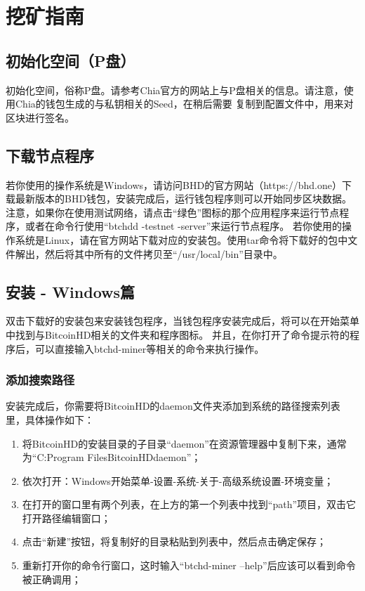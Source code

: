 \chapter{挖矿指南}
\section{初始化空间（P盘）}
\begin{flushleft}
    初始化空间，俗称P盘。请参考Chia官方的网站上与P盘相关的信息。请注意，使用Chia的钱包生成的与私钥相关的Seed，在稍后需要
    复制到配置文件中，用来对区块进行签名。
\end{flushleft}
\section{下载节点程序}
\begin{flushleft}
    若你使用的操作系统是Windows，请访问BHD的官方网站（https://bhd.one）下载最新版本的BHD钱包，安装完成后，运行钱包程序则可以开始同步区块数据。
    注意，如果你在使用测试网络，请点击``绿色''图标的那个应用程序来运行节点程序，或者在命令行使用``btchdd -testnet -server''来运行节点程序。
    若你使用的操作系统是Linux，请在官方网站下载对应的安装包。使用tar命令将下载好的包中文件解出，然后将其中所有的文件拷贝至``/usr/local/bin''目录中。
\end{flushleft}
\section{安装 - Windows篇}
\begin{flushleft}
    双击下载好的安装包来安装钱包程序，当钱包程序安装完成后，将可以在开始菜单中找到与BitcoinHD相关的文件夹和程序图标。
    并且，在你打开了命令提示符的程序后，可以直接输入btchd-miner等相关的命令来执行操作。
\end{flushleft}
\subsection{添加搜索路径}
\begin{flushleft}
    安装完成后，你需要将BitcoinHD的daemon文件夹添加到系统的路径搜索列表里，具体操作如下：
\end{flushleft}
\begin{enumerate}
    \item 将BitcoinHD的安装目录的子目录``daemon''在资源管理器中复制下来，通常为``C:Program FilesBitcoinHDdaemon''；
    \item 依次打开：Windows开始菜单-设置-系统-关于-高级系统设置-环境变量；
    \item 在打开的窗口里有两个列表，在上方的第一个列表中找到``path''项目，双击它打开路径编辑窗口；
    \item 点击``新建''按钮，将复制好的目录粘贴到列表中，然后点击确定保存；
    \item 重新打开你的命令行窗口，这时输入``btchd-miner --help''后应该可以看到命令被正确调用；
\end{enumerate}
